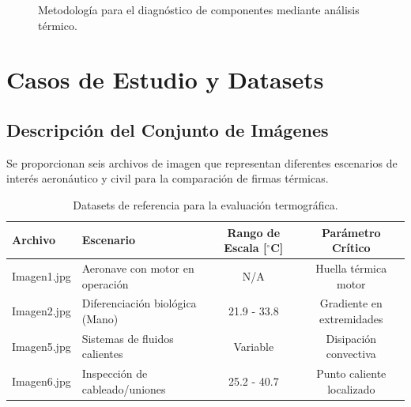 \documentclass[11pt, a4paper]{article}
\begin{document}
\begin{figure}[htbp]
    \centering
    \caption{Metodología para el diagnóstico de componentes mediante análisis térmico.}
\end{figure}

\newpage
\section{Casos de Estudio y Datasets}

\subsection{Descripción del Conjunto de Imágenes}
Se proporcionan seis archivos de imagen que representan diferentes escenarios de interés aeronáutico y civil para la comparación de firmas térmicas.

\begin{table}[htbp]
    \centering
    \begin{tabular}{llcc}
        \toprule
        Archivo & Escenario & Rango de Escala [$^\circ$C] & Parámetro Crítico \\
        \midrule
        Imagen1.jpg & Aeronave con motor en operación & N/A & Huella térmica motor \\
        Imagen2.jpg & Diferenciación biológica (Mano) & 21.9 - 33.8 & Gradiente en extremidades \\
        Imagen5.jpg & Sistemas de fluidos calientes & Variable & Disipación convectiva \\
        Imagen6.jpg & Inspección de cableado/uniones & 25.2 - 40.7 & Punto caliente localizado \\
        \bottomrule
    \end{tabular}
    \caption{Datasets de referencia para la evaluación termográfica.}
\end{table}
\end{document}
